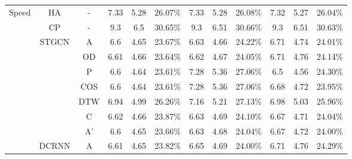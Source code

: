 \begin{table}[t!]
\begin{center}
{\begin{tabular}{c|c|c|ccc|ccc|ccc}
                \multirow{23}{*}{Speed}          & HA                     & -                       & 7.33       & 5.28      & 26.07\%     & 7.33      & 5.28      & 26.08\%     & 7.32       & 5.27       & 26.04\%     \\
                                                 & CP                     & -                       & 9.3        & 6.5       & 30.65\%     & 9.3       & 6.51      & 30.66\%     & 9.3        & 6.51       & 30.63\%     \\
                \cline{2-12}
                                                 & \multirow{7}{*}{STGCN} & A                       & 6.6        & 4.65      & 23.67\%     & 6.63      & 4.66      & 24.22\%     & 6.71       & 4.74       & 24.01\%     \\
                                                 &                        & OD                      & 6.61       & 4.66      & 23.64\%     & 6.62      & 4.67      & 24.05\%     & 6.71       & 4.76       & 24.14\%     \\
                                                 &                        & P                       & 6.6        & 4.64      & 23.61\%     & 7.28      & 5.36      & 27.06\%     & 6.5        & 4.56       & 24.30\%     \\
                                                 &                        & COS                     & 6.6        & 4.64      & 23.61\%     & 7.28      & 5.36      & 27.06\%     & 6.68       & 4.72       & 23.95\%     \\
                                                 &                        & DTW                     & 6.94       & 4.99      & 26.26\%     & 7.16      & 5.21      & 27.13\%     & 6.98       & 5.03       & 25.96\%     \\
                                                 &                        & C                       & 6.62       & 4.66      & 23.87\%     & 6.63      & 4.69      & 24.10\%     & 6.67       & 4.71       & 24.04\%     \\
                                                 &                        & A'                      & 6.6        & 4.65      & 23.66\%     & 6.63      & 4.68      & 24.04\%     & 6.67       & 4.72       & 24.00\%     \\
                \cline{2-12}
                                                 & \multirow{7}{*}{DCRNN} & A                       & 6.61       & 4.65      & 23.82\%     & 6.65      & 4.69      & 24.00\%     & 6.71       & 4.76       & 24.29\%     \\

\end{tabular}}
\end{center}
\end{table}
